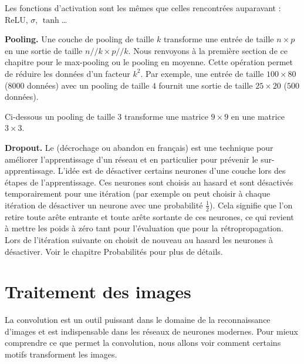 \documentclass[11pt,class=report,crop=false]{standalone}
\begin{document}
Les fonctions d'activation sont les mêmes que celles rencontrées auparavant : ReLU, $\sigma$, $\tanh$\ldots

\bigskip
\textbf{Pooling.}
Une couche de pooling de taille $k$ transforme une entrée de taille $n \times p$ en une sortie de taille $n//k \times p//k$.
Nous renvoyons à la première section de ce chapitre pour le max-pooling ou le pooling en moyenne. Cette opération permet de réduire les données d'un facteur $k^2$.
Par exemple, une entrée de taille $100 \times 80$ ($8 000$ données) avec un pooling de taille $4$ fournit une sortie de taille $25 \times 20$ ($500$ données).

Ci-dessous un pooling de taille $3$ transforme une matrice $9\times 9$ en une matrice $3\times 3$.


\bigskip
\textbf{Dropout.} 
Le  (décrochage ou abandon en français) est une technique pour améliorer l'apprentissage d'un réseau et en particulier pour prévenir le sur-apprentissage. L'idée est de désactiver certains neurones d'une couche lors des étapes de l'apprentissage. Ces neurones sont choisis au hasard et sont désactivés temporairement pour une itération (par exemple on peut choisir à chaque itération de désactiver un neurone avec une probabilité $\frac12$). Cela signifie que l'on retire toute arête entrante et toute arête sortante de ces neurones, ce qui revient à mettre les poids à zéro tant pour l'évaluation que pour la rétropropagation. Lors de l'itération suivante on choisit de nouveau au hasard les neurones à désactiver.
Voir le chapitre \og{}Probabilités\fg{} pour plus de détails. 




\section{Traitement des images}

La convolution est un outil puissant dans le domaine de la reconnaissance d'images et est indispensable dans les réseaux de neurones modernes. Pour mieux comprendre ce que permet la convolution, nous allons voir comment certains motifs transforment les images.
\end{document}
